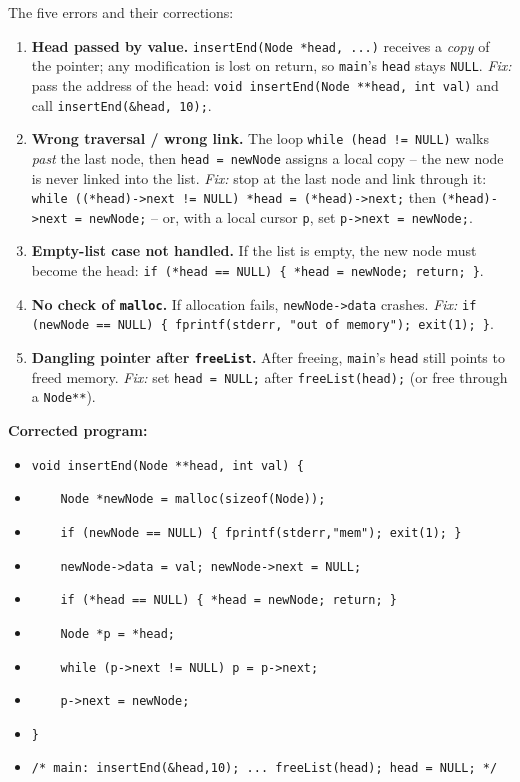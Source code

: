 \documentclass[11pt]{article}
\begin{document}
\begin{corrige}
The five errors and their corrections:

\begin{enumerate}
\item \textbf{Head passed by value.} \texttt{insertEnd(Node *head, ...)} receives a \emph{copy} of the pointer; any modification is lost on return, so \texttt{main}'s \texttt{head} stays \texttt{NULL}. \emph{Fix:} pass the address of the head: \texttt{void insertEnd(Node **head, int val)} and call \texttt{insertEnd(\&head, 10);}.
\item \textbf{Wrong traversal / wrong link.} The loop \texttt{while (head != NULL)} walks \emph{past} the last node, then \texttt{head = newNode} assigns a local copy -- the new node is never linked into the list. \emph{Fix:} stop at the last node and link through it: \texttt{while ((*head)->next != NULL) *head = (*head)->next;} then \texttt{(*head)->next = newNode;} -- or, with a local cursor \texttt{p}, set \texttt{p->next = newNode;}.
\item \textbf{Empty-list case not handled.} If the list is empty, the new node must become the head: \texttt{if (*head == NULL) \{ *head = newNode; return; \}}.
\item \textbf{No check of \texttt{malloc}.} If allocation fails, \texttt{newNode->data} crashes. \emph{Fix:} \texttt{if (newNode == NULL) \{ fprintf(stderr, "out of memory"); exit(1); \}}.
\item \textbf{Dangling pointer after \texttt{freeList}.} After freeing, \texttt{main}'s \texttt{head} still points to freed memory. \emph{Fix:} set \texttt{head = NULL;} after \texttt{freeList(head);} (or free through a \texttt{Node**}).
\end{enumerate}

\textbf{Corrected program:}
\begin{itemize}
\item[] \texttt{void insertEnd(Node **head, int val) \{}
\item[] \texttt{\ \ \ \ Node *newNode = malloc(sizeof(Node));}
\item[] \texttt{\ \ \ \ if (newNode == NULL) \{ fprintf(stderr,"mem"); exit(1); \}}
\item[] \texttt{\ \ \ \ newNode->data = val; newNode->next = NULL;}
\item[] \texttt{\ \ \ \ if (*head == NULL) \{ *head = newNode; return; \}}
\item[] \texttt{\ \ \ \ Node *p = *head;}
\item[] \texttt{\ \ \ \ while (p->next != NULL) p = p->next;}
\item[] \texttt{\ \ \ \ p->next = newNode;}
\item[] \texttt{\}}
\item[] \texttt{/* main: insertEnd(\&head,10); ... freeList(head); head = NULL; */}
\end{itemize}
\end{corrige}
\end{document}
